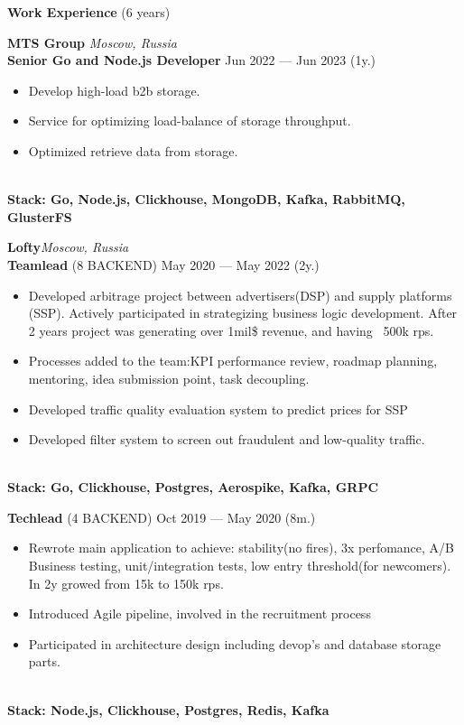 \documentclass[a4paper]{resume} %
\begin{document}
\begin{rSection}{\textbf{Work Experience} (6 years) }

\textbf{MTS Group} \hfill \textit{Moscow, Russia} \\
\textbf{Senior Go and Node.js Developer}  \hfill Jun 2022 --- Jun 2023 (1y.)
\begin{itemize}
    \setlength\itemsep{-0.4em}
    \item Develop high-load b2b storage.
    \item Service for optimizing load-balance of storage throughput.
    \item Optimized retrieve data from storage.
\end{itemize}
\\\textbf{Stack: Go, Node.js, Clickhouse, MongoDB, Kafka, RabbitMQ, GlusterFS}

\textbf{Lofty}\hfill \textit{Moscow, Russia} \\
\textbf{Teamlead} (8 BACKEND) \hfill May 2020 --- May 2022 (2y.)
\begin{itemize}
    \setlength\itemsep{-0.4em}
    \item Developed arbitrage project between advertisers(DSP) and supply platforms (SSP). Actively participated in strategizing
    	   business logic development.
    	   After 2 years project was generating over 1mil\$ revenue, and having ~500k rps.
    \item Processes added to the team:KPI performance review, roadmap planning, mentoring, idea submission point, task decoupling.
    \item Developed traffic quality evaluation system to predict prices for SSP
    \item Developed filter system to screen out fraudulent and low-quality traffic.
\end{itemize}
\\\textbf{Stack: Go, Clickhouse, Postgres, Aerospike, Kafka, GRPC}

\textbf{Techlead} (4 BACKEND) \hfill Oct 2019 --- May 2020 (8m.)
\begin{itemize}
    \setlength\itemsep{-0.4em}
    \item Rewrote main application to achieve: stability(no fires), 3x perfomance, A/B Business testing, unit/integration tests, low
    	    entry threshold(for newcomers).
    	    In 2y growed from 15k to 150k rps.
    \item Introduced Agile pipeline, involved in the recruitment process
    \item Participated in architecture design including devop's and database storage parts.
\end{itemize}
\\\textbf{Stack: Node.js, Clickhouse, Postgres, Redis, Kafka}


\end{rSection}
\end{document}
